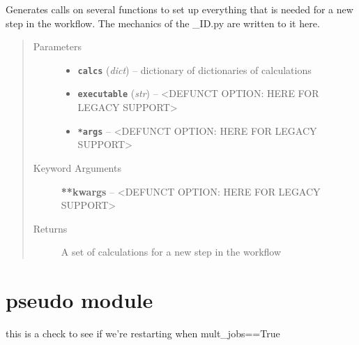 \documentclass[letterpaper,10pt,english]{sphinxmanual}
\begin{document}

\begin{fulllineitems}
\label{prep:prep.writeToScript}
Generates calls on several functions to set up everything that is needed for a new step in the workflow.
The mechanics of the \_ID.py are written to it here.
\begin{quote}\begin{description}
\item[{Parameters}] \leavevmode\begin{itemize}
\item {} 
\textbf{\texttt{calcs}} (\emph{dict}) -- dictionary of dictionaries of calculations

\item {} 
\textbf{\texttt{executable}} (\emph{str}) -- \textless{}DEFUNCT OPTION: HERE FOR LEGACY SUPPORT\textgreater{}

\item {} 
\textbf{\texttt{*args}} -- \textless{}DEFUNCT OPTION: HERE FOR LEGACY SUPPORT\textgreater{}

\end{itemize}

\item[{Keyword Arguments}] \leavevmode
\textbf{**kwargs} --
\textless{}DEFUNCT OPTION: HERE FOR LEGACY SUPPORT\textgreater{}

\item[{Returns}] \leavevmode
A set of calculations for a new step in the workflow

\end{description}\end{quote}

\end{fulllineitems}



\chapter{pseudo module}
\label{pseudo::doc}\label{pseudo:pseudo-module}\label{pseudo:module-pseudo}

\begin{fulllineitems}
\label{pseudo:pseudo.__crawlingMinimization}
this is a check to see if we're restarting when mult\_jobs==True

\end{fulllineitems}
\end{document}
